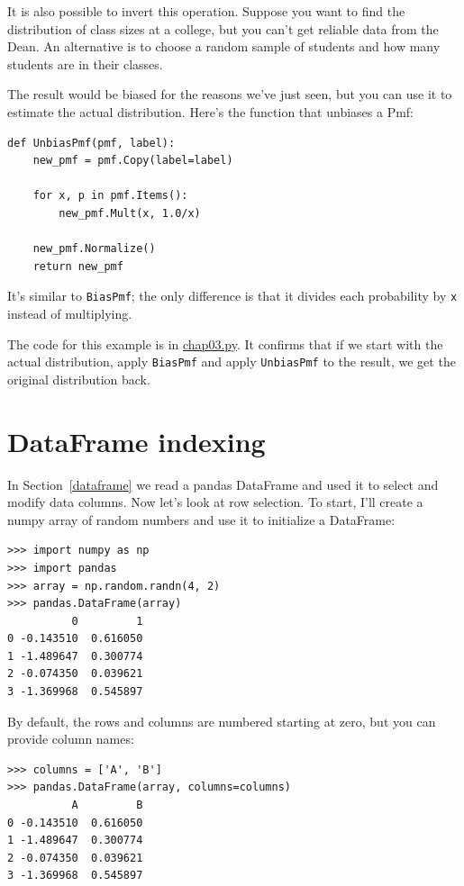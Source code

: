 \documentclass[12pt]{book}
\begin{document}
It is also possible to invert this operation.  Suppose you want to
find the distribution of class sizes at a college, but you can't get
reliable data from the Dean.  An alternative is to choose a random
sample of students and how many students are in their
classes.   

The result would be biased for the reasons we've just seen, but you
can use it to estimate the actual distribution.  Here's the function
that unbiases a Pmf:

\begin{verbatim}
def UnbiasPmf(pmf, label):
    new_pmf = pmf.Copy(label=label)

    for x, p in pmf.Items():
        new_pmf.Mult(x, 1.0/x)
        
    new_pmf.Normalize()
    return new_pmf
\end{verbatim}

It's similar to {\tt BiasPmf}; the only difference is that it
divides each probability by {\tt x} instead of multiplying.

The code for this example is in \url{chap03.py}.  It confirms that
if we start with the actual distribution, apply {\tt BiasPmf}
and apply {\tt UnbiasPmf} to the result, we get the original
distribution back.


\section{DataFrame indexing}

In Section~\ref{dataframe} we read a pandas DataFrame and used it to
select and modify data columns.  Now let's look at row selection.
To start, I'll create a numpy array of random numbers and use it
to initialize a DataFrame:

\begin{verbatim}
>>> import numpy as np
>>> import pandas
>>> array = np.random.randn(4, 2)
>>> pandas.DataFrame(array)
          0         1
0 -0.143510  0.616050
1 -1.489647  0.300774
2 -0.074350  0.039621
3 -1.369968  0.545897
\end{verbatim}

By default, the rows and columns are numbered starting at zero, but
you can provide column names:

\begin{verbatim}
>>> columns = ['A', 'B']
>>> pandas.DataFrame(array, columns=columns)
          A         B
0 -0.143510  0.616050
1 -1.489647  0.300774
2 -0.074350  0.039621
3 -1.369968  0.545897
\end{verbatim}
\end{document}
